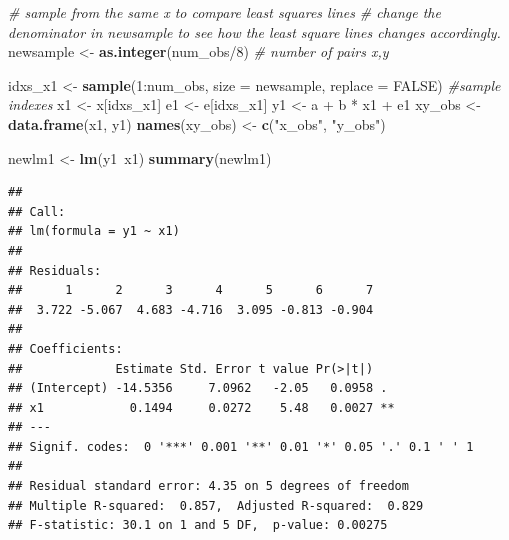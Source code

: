 \documentclass[]{book}
\newenvironment{Shaded}{\begin{snugshade}}{\end{snugshade}}
\newcommand{\KeywordTok}[1]{\textcolor[rgb]{0.13,0.29,0.53}{\textbf{{#1}}}}
\newcommand{\DataTypeTok}[1]{\textcolor[rgb]{0.13,0.29,0.53}{{#1}}}
\newcommand{\DecValTok}[1]{\textcolor[rgb]{0.00,0.00,0.81}{{#1}}}
\newcommand{\StringTok}[1]{\textcolor[rgb]{0.31,0.60,0.02}{{#1}}}
\newcommand{\CommentTok}[1]{\textcolor[rgb]{0.56,0.35,0.01}{\textit{{#1}}}}
\newcommand{\OtherTok}[1]{\textcolor[rgb]{0.56,0.35,0.01}{{#1}}}
\newcommand{\NormalTok}[1]{{#1}}
\begin{document}
\begin{Shaded}
\begin{Highlighting}[]
\CommentTok{# sample from  the same  x     to compare least squares lines }
\CommentTok{# change the denominator in newsample to see how the least square lines changes accordingly. }
\NormalTok{newsample <-}\StringTok{ }\KeywordTok{as.integer}\NormalTok{(num_obs/}\DecValTok{8}\NormalTok{) }\CommentTok{# number of pairs x,y}

\NormalTok{idxs_x1 <-}\StringTok{ }\KeywordTok{sample}\NormalTok{(}\DecValTok{1}\NormalTok{:num_obs, }\DataTypeTok{size =} \NormalTok{newsample, }\DataTypeTok{replace =} \OtherTok{FALSE}\NormalTok{) }\CommentTok{#sample indexes}
\NormalTok{x1 <-}\StringTok{ }\NormalTok{x[idxs_x1]}
\NormalTok{e1 <-}\StringTok{ }\NormalTok{e[idxs_x1]}
\NormalTok{y1 <-}\StringTok{ }\NormalTok{a +}\StringTok{ }\NormalTok{b *}\StringTok{ }\NormalTok{x1 +}\StringTok{ }\NormalTok{e1}
\NormalTok{xy_obs <-}\StringTok{ }\KeywordTok{data.frame}\NormalTok{(x1, y1)}
\KeywordTok{names}\NormalTok{(xy_obs) <-}\StringTok{ }\KeywordTok{c}\NormalTok{(}\StringTok{"x_obs"}\NormalTok{, }\StringTok{"y_obs"}\NormalTok{)}

\NormalTok{newlm1 <-}\StringTok{ }\KeywordTok{lm}\NormalTok{(y1~x1)}
\KeywordTok{summary}\NormalTok{(newlm1)}
\end{Highlighting}
\end{Shaded}

\begin{verbatim}
## 
## Call:
## lm(formula = y1 ~ x1)
## 
## Residuals:
##      1      2      3      4      5      6      7 
##  3.722 -5.067  4.683 -4.716  3.095 -0.813 -0.904 
## 
## Coefficients:
##             Estimate Std. Error t value Pr(>|t|)   
## (Intercept) -14.5356     7.0962   -2.05   0.0958 . 
## x1            0.1494     0.0272    5.48   0.0027 **
## ---
## Signif. codes:  0 '***' 0.001 '**' 0.01 '*' 0.05 '.' 0.1 ' ' 1
## 
## Residual standard error: 4.35 on 5 degrees of freedom
## Multiple R-squared:  0.857,  Adjusted R-squared:  0.829 
## F-statistic: 30.1 on 1 and 5 DF,  p-value: 0.00275
\end{verbatim}
\end{document}
